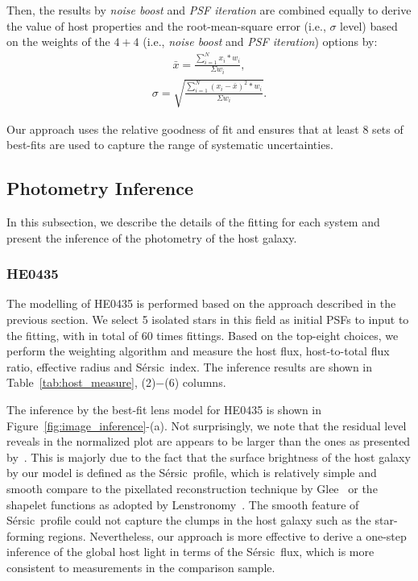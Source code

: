 \documentclass[fleqn,usenatbib]{mnras}
\newcommand{\sersic}{S\'ersic}
\newcommand{\lenstronomy}{{\sc Lenstronomy}}
\begin{document}
Then, the results by {\it noise boost} and {\it PSF iteration} are combined equally to derive the value of host properties and the root-mean-square error (i.e., $\sigma$ level) based on the weights of the $4+4$ (i.e., {\it noise boost} and {\it PSF iteration}) options by:
\begin{eqnarray}
\label{eq:infer_value}
\bar{x}  =  \frac{  \sum_{i=1}^{N}   x_i * w_i  }{\Sigma w_i} ,
\end{eqnarray} 
\begin{eqnarray}
\label{eq:infer_scatter}
\sigma =   \sqrt{ \frac{  \sum_{i=1}^{N}   (x_i -  \bar{x} ) ^2 * w_i  }{\Sigma w_i} }.
\end{eqnarray} 

Our approach uses the relative goodness of fit and ensures that at least 8 sets of best-fits are used to capture the range of systematic uncertainties.

\subsection{Photometry Inference}\label{sec:photometry}
In this subsection, we describe the details of the fitting for each system and present the inference of the photometry of the host galaxy.

\subsubsection{HE0435}
The modelling of HE0435 is performed based on the approach described in the previous section. We select 5 isolated stars in this field as initial PSFs to input to the fitting, with in total of 60 times fittings. Based on the top-eight choices, we perform the weighting algorithm and measure the host flux, host-to-total flux ratio, effective radius and \sersic\ index. The inference results are shown in Table~\ref{tab:host_measure}, (2)$-$(6) columns.

The inference by the best-fit lens model for HE0435 is shown in Figure~\ref{fig:image_inference}-(a). Not surprisingly, we note that the residual level reveals in the normalized plot are appears to be larger than the ones as presented by~\citet{Wong2017}. This is majorly due to the fact that the surface brightness of the host galaxy by our model is defined as the \sersic\ profile, which is relatively simple and smooth compare to the pixellated reconstruction technique by {\sc Glee}~\citep{Suy++06, Halk2008, S+H10} or the shapelet functions as adopted by \lenstronomy~\citep{Refregier2003, Birrer2015}. The smooth feature of \sersic\ profile could not capture the clumps in the host galaxy such as the star-forming regions. Nevertheless, our approach is more effective to derive a one-step inference of the global host light in terms of the \sersic\ flux, which is more consistent to measurements in the comparison sample. 
\end{document}

